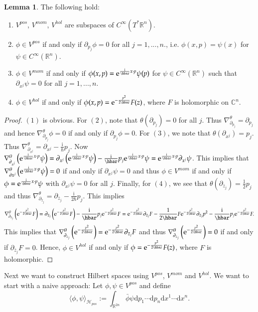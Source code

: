 \documentclass[11pt]{amsart}
\numberwithin{equation}{section}
\theoremstyle{plain}
\theoremstyle{definition}
\newtheorem{lem}{Lemma}[subsection]
\theoremstyle{remark}
\newcommand{\R}{\mathbb{R}}
\newcommand{\dd}{{\mathrm{d}}}
\newcommand{\calH}{\mathcal{H}}
\newcommand{\I}{\mathrm{i}}
\newcommand{\ee}{\textnormal{e}}
\begin{document}
\begin{lem}
The following hold:
\begin{enumerate}
\item{$V^{pos}$, $V^{mom}$, $V^{hol}$ are subspaces of $C^\infty(T^*\R^n)$.
}
\item{$\phi\in V^{pos}$ if and only if $\partial_{p_j}\phi=0$ for all $j=1,...,n$., i.e. $\phi(x,p)=\psi(x)$ for $\psi\in C^\infty(\R^n)$.
}
\item{$\phi\in V^{mom}$ if and only if $\phi(x,p)=\ee^{\frac{\I}{\hbar}x\cdot p}\psi(p)$ for $\psi\in C^\infty(\R^n)$ such that $\partial_{x^j}\psi=0$ for all $j=1,...,n$.
}
\item{$\phi\in V^{hol}$ if and only if $\phi(x,p)=\ee^{-\frac{p^2}{2\hbar}}F(z)$, where $F$ is holomorphic on $\mathbb{C}^n$.

}
\end{enumerate}
\end{lem}

\begin{proof}
$(1)$ is obvious. For $(2)$, note that $\theta(\partial_{p_j})=0$ for all $j$. Thus $\nabla_{\partial_{p_j}}^\theta=\partial_{p_j}$ and hence $\nabla_{\partial_{p_j}}^\theta\phi=0$ if and only if $\partial_{p_j}\phi=0$. For $(3)$, we note that $\theta(\partial_{x^j})=p_j$. Thus $\nabla_{\partial_{x^j}}^\theta=\partial_{x^j}-\frac{\I}{\hbar}p_j$. Now $\nabla_{\partial_{x^j}}^\theta\left(\ee^{\frac{\I}{\hbar}x\cdot p}\psi\right)=\partial_{x^j}\left(\ee^{\frac{\I}{\hbar}x\cdot p}\psi\right)-\frac{\I}{\hbar}p_j\ee^{\frac{\I}{\hbar}x\cdot p}\psi=\ee^{\frac{\I}{\hbar}x\cdot p}\partial_{x^j}\psi$. This implies that $\nabla_{\partial x^j}^\theta\left(\ee^{\frac{\I}{\hbar}x\cdot p}\psi\right)=0$ if and only if $\partial_{x^j}\psi=0$ and thus $\phi\in V^{mom}$ if and only if $\phi=\ee^{\frac{\I}{\hbar}x\cdot p}\psi$ with $\partial_{x^j}\psi=0$ for all $j$. Finally, for $(4)$, we see that $\theta(\partial_{\bar z_j})=\frac{1}{2}p_j$ and thus $\nabla_{\partial_{\bar z_j}}^\theta=\partial_{\bar z_j}-\frac{\I}{2\hbar}p_j$. This implies 
$$\nabla_{\partial_{\bar z_j}}^\theta\left(\ee^{-\frac{p^2}{2\hbar}}F\right)=\partial_{\bar z_j}\left(\ee^{-\frac{p^2}{2\hbar}}F\right)-\frac{\I}{\hbar}p_j\ee^{-\frac{p^2}{2\hbar}}F=\ee^{-\frac{p^2}{2\hbar}}\partial_{\bar z_j}F-\frac{1}{2\hbar}F\ee^{-\frac{p^2}{2\hbar}}\partial_{\bar z_j}p^2-\frac{\I}{\hbar}p_j\ee^{-\frac{p^2}{2\hbar}}F.$$
This implies that $\nabla_{\partial_{z_j}}^\theta\left(\ee^{-\frac{p^2}{2\hbar}}\right)=\ee^{-\frac{p^2}{2\hbar}}\partial_{\bar z_j}F$ and thus $\nabla_{\partial_{z_j}}^\theta\left(\ee^{-\frac{p^2}{2\hbar}}\right)=0$ if and only if $\partial_{\bar z_j}F=0$. Hence, $\phi\in V^{hol}$ if and only if $\phi=\ee^{-\frac{p^2}{2\hbar}}F(z)$, where $F$ is holomorphic.
\end{proof}
Next we want to construct Hilbert spaces using $V^{pos}$, $V^{mom}$ and $V^{hol}$. We want to start with a naive approach: Let $\phi,\psi\in V^{pos}$ and define 
\begin{equation}
\label{inner_prod}
\langle \phi,\psi\rangle_{\calH_{pos}}:=\int_{\R^{2n}}\bar\phi\psi\dd p_1\dotsm\dd p_n\dd x^{1}\dotsm\dd x^n.
\end{equation}
\end{document}

